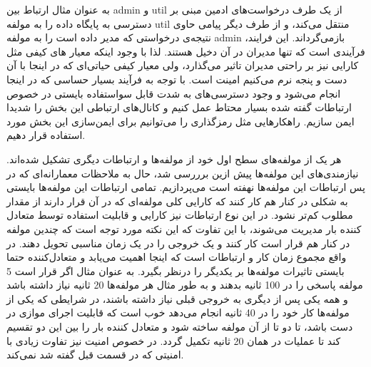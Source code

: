  به عنوان مثال ارتباط  بین admin  و util از یک طرف درخواست‌های ادمین مبنی بر دسترسی به پایگاه داده را به مولفه util منتقل می‌کند، و از طرف دیگر پیامی حاوی نتیجه‌ی درخواستی که مدیر داده است را به مولفه admin بازمی‌گرداند. این فرایند، فرآیندی است که تنها مدیران در آن دخیل هستند. لذا با وجود اینکه معیار های کیفی مثل کارایی نیز بر راحتی مدیران تاثیر می‌گذارد، ولی معیار کیفی حیاتی‌ای که در اینجا با آن دست و پنجه نرم می‌کنیم امینت است. با توجه به فرآیند بسیار حساسی که در اینجا انجام می‌شود و وجود دسترسی‌های به شدت قابل سواستفاده بایستی در خصوص ارتباطات گفته شده بسیار محتاط عمل کنیم و کانال‌های ارتباطی این بخش را شدیدا ایمن سازیم. راهکارهایی مثل رمزگذاری را می‌توانیم برای ایمن‌سازی این بخش مورد استفاده قرار دهیم.







هر یک از مولفه‌های سطح اول خود از مولفه‌ها و ارتباطات دیگری تشکیل شده‌اند. نیازمندی‌های این مولفه‌ها پیش ازین برررسی شد، حال به ملاحظات معمارانه‌ای که در پس ارتباطات این مولفه‌ها نهفته است می‌پردازیم. تمامی ارتباطات این مولفه‌ها بایستی به شکلی در کنار هم کار کنند که کارایی کلی مولفه‌ای که در آن قرار دارند از مقدار مطلوب کم‌تر نشود. در این نوع ارتباطات نیز کارایی و قابلیت استفاده توسط متعادل کننده بار مدیریت می‌شوند، با این تفاوت که این نکته مورد توجه است که چندین مولفه در کنار هم قرار است کار کنند و یک خروجی را در یک زمان مناسبی تحویل دهند. در واقع مجموع زمان کار و ارتباطات است که اینجا اهمیت می‌یابد و متعادل‌کننده حتما بایستی تاثیرات مولفه‌ها بر یکدیگر را درنظر بگیرد. به عنوان مثال اگر قرار است 5 مولفه پاسخی را در 100 ثانیه بدهند و به طور مثال هر مولفه‌ها 20 ثانیه نیاز داشته باشد و همه یکی پس از دیگری به خروجی قبلی نیاز داشته باشند، در شرایطی که یکی از مولفه‌ها کار خود را در 40 ثانیه انجام می‌دهد خوب است که قابلیت اجرای موازی در دست باشد، تا دو تا از آن مولفه ساخته شود و متعادل کننده بار را بین این دو تقسیم کند تا عملیات در همان 20 ثانیه تکمیل گردد. در خصوص امنیت نیز تفاوت زیادی با امنیتی که در قسمت قبل گفته شد نمی‌کند.

